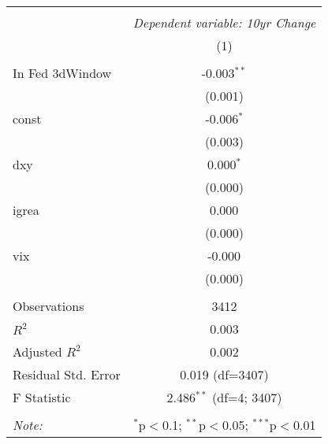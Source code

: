 \begin{table}[!htbp] \centering
\begin{tabular}{@{\extracolsep{5pt}}lc}
\\[-1.8ex]\hline
\hline \\[-1.8ex]
& \multicolumn{1}{c}{\textit{Dependent variable: 10yr Change}} \
\cr \cline{2-2}
\\[-1.8ex] & (1) \\
\hline \\[-1.8ex]
 In Fed 3dWindow & -0.003$^{**}$ \\
& (0.001) \\
 const & -0.006$^{*}$ \\
& (0.003) \\
 dxy & 0.000$^{*}$ \\
& (0.000) \\
 igrea & 0.000$^{}$ \\
& (0.000) \\
 vix & -0.000$^{}$ \\
& (0.000) \\
\hline \\[-1.8ex]
 Observations & 3412 \\
 $R^2$ & 0.003 \\
 Adjusted $R^2$ & 0.002 \\
 Residual Std. Error & 0.019 (df=3407) \\
 F Statistic & 2.486$^{**}$ (df=4; 3407) \\
\hline
\hline \\[-1.8ex]
\textit{Note:} & \multicolumn{1}{r}{$^{*}$p$<$0.1; $^{**}$p$<$0.05; $^{***}$p$<$0.01} \\
\end{tabular}
\end{table}